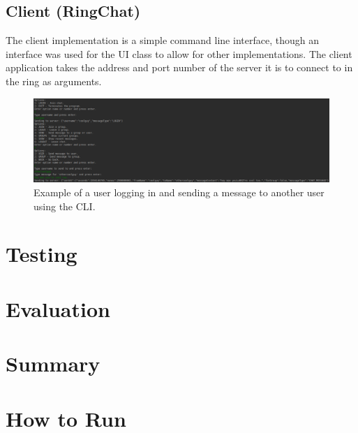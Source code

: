 \documentclass[12pt]{article}
\begin{document}
\subsection{Client (RingChat)}

The client implementation is a simple command line interface, though an interface was used for the UI class to allow for other implementations. The client application takes the address and port number of the server it is to connect to in the ring as arguments. 

\begin{figure}[!ht]
	\centering
	\includegraphics[width=\linewidth]{images/chat}
	\caption{Example of a user logging in and sending a message to another user using the CLI.}
	\label{fig:clientchat}
\end{figure}

\section{Testing}

\section{Evaluation}

\section{Summary}

\section{How to Run}



\end{document}
